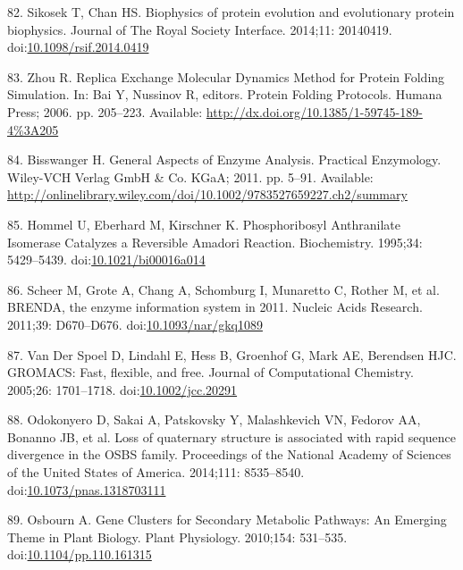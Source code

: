 \documentclass[12pt,twoside]{reedthesis}
\begin{document}
  \hypertarget{ref-sikosekux5fbiophysicsux5f2014}{}
  82. Sikosek T, Chan HS. Biophysics of protein evolution and evolutionary
  protein biophysics. Journal of The Royal Society Interface. 2014;11:
  20140419.
  doi:\href{https://doi.org/10.1098/rsif.2014.0419}{10.1098/rsif.2014.0419}
  
  \hypertarget{ref-baiux5freplicaux5f2006}{}
  83. Zhou R. Replica Exchange Molecular Dynamics Method for Protein
  Folding Simulation. In: Bai Y, Nussinov R, editors. Protein Folding
  Protocols. Humana Press; 2006. pp. 205--223. Available:
  \url{http://dx.doi.org/10.1385/1-59745-189-4\%3A205}
  
  \hypertarget{ref-bisswangerux5fgeneralux5f2011}{}
  84. Bisswanger H. General Aspects of Enzyme Analysis. Practical
  Enzymology. Wiley-VCH Verlag GmbH \& Co. KGaA; 2011. pp. 5--91.
  Available:
  \url{http://onlinelibrary.wiley.com/doi/10.1002/9783527659227.ch2/summary}
  
  \hypertarget{ref-hommelux5fphosphoribosylux5f1995}{}
  85. Hommel U, Eberhard M, Kirschner K. Phosphoribosyl Anthranilate
  Isomerase Catalyzes a Reversible Amadori Reaction. Biochemistry.
  1995;34: 5429--5439.
  doi:\href{https://doi.org/10.1021/bi00016a014}{10.1021/bi00016a014}
  
  \hypertarget{ref-scheerux5fbrendaux5f2011}{}
  86. Scheer M, Grote A, Chang A, Schomburg I, Munaretto C, Rother M, et
  al. BRENDA, the enzyme information system in 2011. Nucleic Acids
  Research. 2011;39: D670--D676.
  doi:\href{https://doi.org/10.1093/nar/gkq1089}{10.1093/nar/gkq1089}
  
  \hypertarget{ref-vanux5fderux5fspoelux5fgromacsux5f2005}{}
  87. Van Der Spoel D, Lindahl E, Hess B, Groenhof G, Mark AE, Berendsen
  HJC. GROMACS: Fast, flexible, and free. Journal of Computational
  Chemistry. 2005;26: 1701--1718.
  doi:\href{https://doi.org/10.1002/jcc.20291}{10.1002/jcc.20291}
  
  \hypertarget{ref-odokonyeroux5flossux5f2014}{}
  88. Odokonyero D, Sakai A, Patskovsky Y, Malashkevich VN, Fedorov AA,
  Bonanno JB, et al. Loss of quaternary structure is associated with rapid
  sequence divergence in the OSBS family. Proceedings of the National
  Academy of Sciences of the United States of America. 2014;111:
  8535--8540.
  doi:\href{https://doi.org/10.1073/pnas.1318703111}{10.1073/pnas.1318703111}
  
  \hypertarget{ref-osbournux5fgeneux5f2010}{}
  89. Osbourn A. Gene Clusters for Secondary Metabolic Pathways: An
  Emerging Theme in Plant Biology. Plant Physiology. 2010;154: 531--535.
  doi:\href{https://doi.org/10.1104/pp.110.161315}{10.1104/pp.110.161315}
  
\end{document}
